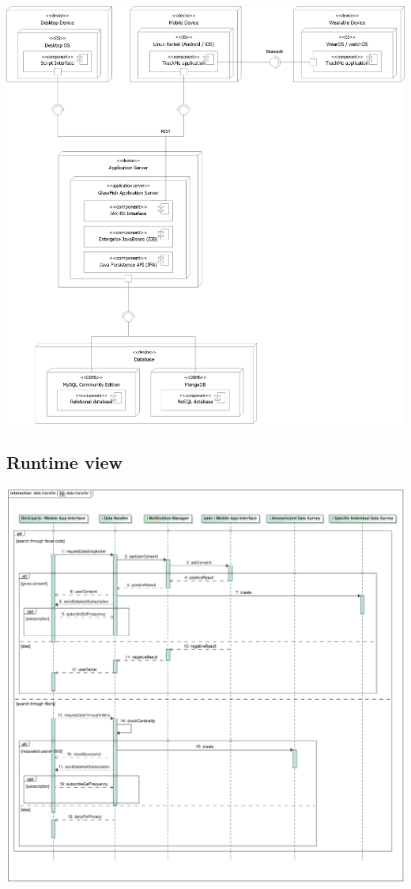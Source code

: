 \begin{center}
\includegraphics[scale=0.5]{sections/diagrams/deployment.png}
\newline
{}
\end{center}

\subsection{Runtime view}

\begin{center}
\includegraphics[scale=0.4]{sections/diagrams/data_transfer}
\end{center}

